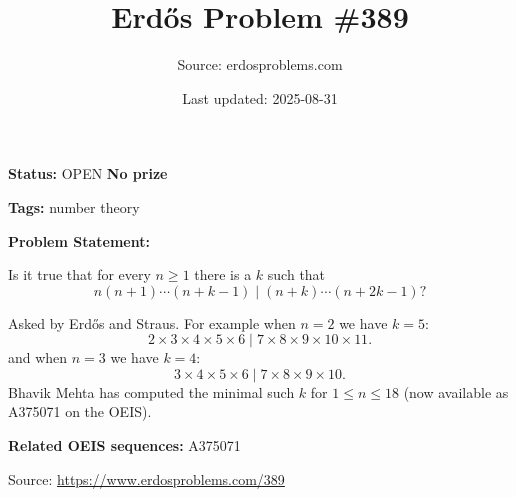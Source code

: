 \documentclass{article}
\title{Erd\H{o}s Problem \#389}
\date{Last updated: 2025-08-31}
\author{Source: erdosproblems.com}
\begin{document}
\maketitle

\noindent\textbf{Status:} OPEN \quad \textbf{No prize}

\noindent\textbf{Tags:} number theory

\medskip

\noindent\textbf{Problem Statement:}

Is it true that for every $n\geq 1$ there is a $k$ such that\[n(n+1)\cdots(n+k-1)\mid (n+k)\cdots (n+2k-1)?\]




Asked by Erd\H{o}s and Straus. For example when $n=2$ we have $k=5$:\[2\times 3 \times 4 \times 5\times 6 \mid 7 \times 8 \times 9\times 10\times 11.\]and when $n=3$ we have $k=4$:\[3\times 4\times 5\times 6 \mid 7\times 8\times 9\times 10.\]Bhavik Mehta has computed the minimal such $k$ for $1\leq n\leq 18$ (now available as A375071 on the OEIS).

\noindent\textbf{Related OEIS sequences:} A375071


\bigskip
\noindent\small{Source: \url{https://www.erdosproblems.com/389}}
\end{document}
